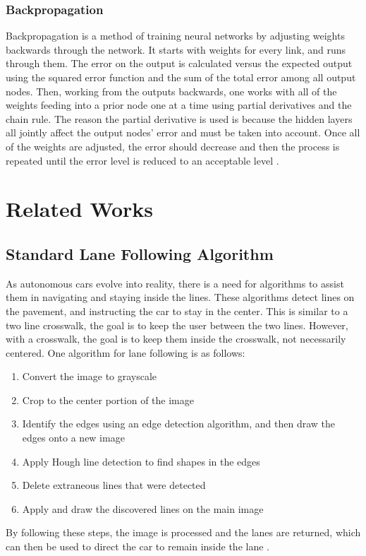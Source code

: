 \documentclass[12pt]{ucthesis}
\begin{document}
\subsection{Backpropagation}
\label{Backpropagation Neural Network}
Backpropagation is a method of training neural networks by adjusting weights backwards through the network. It starts with weights for every link, and runs through them. The error on the output is calculated versus the expected output using the squared error function and the sum of the total error among all output nodes. Then, working from the outputs backwards, one works with all of the weights feeding into a prior node one at a time using partial derivatives and the chain rule. The reason the partial derivative is used is because the hidden layers all jointly affect the output nodes' error and must be taken into account. Once all of the weights are adjusted, the error should decrease and then the process is repeated until the error level is reduced to an acceptable level \cite{backpropositionPaper}. 

\chapter{Related Works}
\label{Related Works}

\section{Standard Lane Following Algorithm}
As autonomous cars evolve into reality, there is a need for algorithms
to assist them in navigating and staying inside the lines. These
algorithms detect lines on the pavement, and
instructing the car to stay in the center. This is similar to
a two line crosswalk, the goal is to keep the user between the two
lines. However, with a crosswalk, the goal is to keep them inside the crosswalk, not necessarily centered.
One algorithm for lane following is as follows:
\begin{enumerate}
  \item Convert the image to grayscale
  \item Crop to the center portion of the image
  \item Identify the edges using an edge detection algorithm, and then draw the
  edges onto a new image
  \item Apply Hough line detection to find shapes in the edges
  \item Delete extraneous lines that were detected
  \item Apply and draw the discovered lines on the main image
\end{enumerate}
By following these steps, the image is processed and the lanes are returned,
which can then be used to direct the car to remain inside the lane \cite{SingleLane1}.
\end{document}
